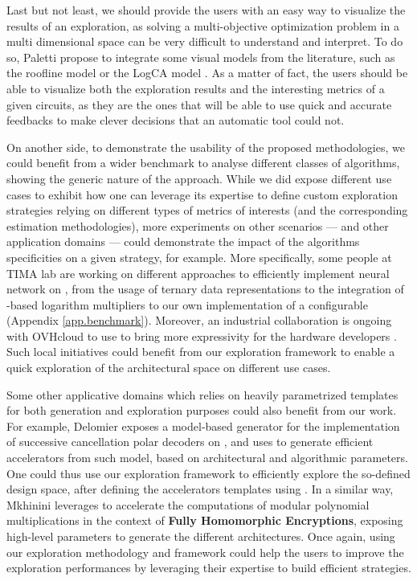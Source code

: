 Last but not least, we should provide the users with an easy way to visualize the results of an exploration, as solving a multi-objective optimization problem in a multi dimensional space can be very difficult to understand and interpret.
To do so, Paletti \etal{} \cite{paletti_dovado_2021} propose to integrate some visual models from the literature, such as the roofline model \cite{williams_roofline_2009} or the LogCA model \cite{altaf2017logca}.
As a matter of fact, the users should be able to visualize both the exploration results and the interesting metrics of a given circuits, as they are the ones that will be able to use quick and accurate feedbacks to make clever decisions that an automatic tool could not.

On another side, to demonstrate the usability of the proposed methodologies, we could benefit from a wider benchmark to analyse different classes of algorithms, showing the generic nature of the approach.
While we did expose different use cases to exhibit how one can leverage its expertise to define custom exploration strategies relying on different types of metrics of interests (and the corresponding estimation methodologies), more experiments on other scenarios --- and other application domains --- could demonstrate the impact of the algorithms specificities on a given strategy, for example.
\clearpage
\noindent More specifically, some people at TIMA lab are working on different approaches to efficiently implement neural network on , from the usage of ternary data representations \cite{prost2017scalable} to the integration of -based logarithm multipliers to our own implementation of a configurable  (Appendix \ref{app.benchmark}).
Moreover, an industrial collaboration is ongoing with OVHcloud to use \chisel{} to bring more expressivity for the hardware developers \cite{bruant_towards_2021}.
Such local initiatives could benefit from our exploration framework to enable a quick exploration of the architectural space on different use cases.

Some other applicative domains which relies on heavily parametrized templates for both generation and exploration purposes could also benefit from our work.
For example, Delomier \etal{} \cite{delomier_model-based_2020} exposes a model-based generator for the implementation of successive cancellation polar decoders on , and uses  to generate efficient accelerators from such model, based on architectural and algorithmic parameters.
One could thus use our exploration framework to efficiently explore the so-defined design space, after defining the accelerators templates using \chisel.
In a similar way, Mkhinini \etal{} \cite{mkhinini_hls_2017} leverages  to accelerate the computations of modular polynomial multiplications in the context of {\bf Fully Homomorphic Encryptions}, exposing high-level parameters to generate the different architectures.
Once again, using our exploration methodology and framework could help the users to improve the exploration performances by leveraging their expertise to build efficient strategies.


